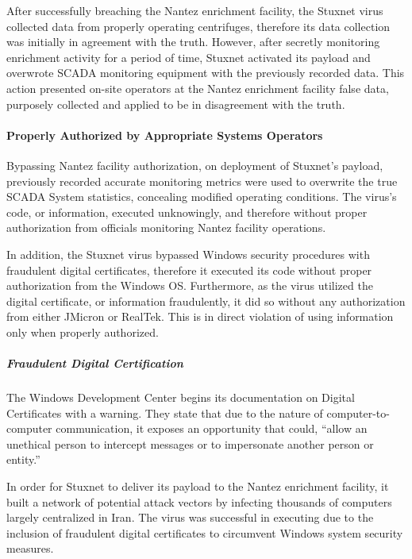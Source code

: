 \documentclass[12pt]{article}
\begin{document}
\begin{multicols}{2}
After successfully breaching the Nantez enrichment facility, the Stuxnet virus collected data from properly operating centrifuges, therefore its data collection was initially in agreement with the truth. However, after secretly monitoring enrichment activity for a period of time, Stuxnet activated its payload and overwrote SCADA monitoring equipment with the previously recorded data.\cite{toKillACentrifuge} This action presented on-site operators at the Nantez enrichment facility false data, purposely collected and applied to be in disagreement with the truth.

\paragraph{Properly Authorized by Appropriate Systems Operators}

Bypassing Nantez facility authorization, on deployment of Stuxnet's payload, previously recorded accurate monitoring metrics were used to overwrite the true SCADA System statistics, concealing modified operating conditions.\cite{theRealStoryOfStuxnet} The virus's code, or information, executed unknowingly, and therefore without proper authorization from officials monitoring Nantez facility operations.

In addition, the Stuxnet virus bypassed Windows security procedures with fraudulent digital certificates, therefore it executed its code without proper authorization from the Windows OS. Furthermore, as the virus utilized the digital certificate, or information fraudulently, it did so without any authorization from either JMicron or RealTek.\cite{signedUsingCertificates} This is in direct violation of using information only when properly authorized.

\subparagraph{Fraudulent Digital Certification}

The Windows Development Center begins its documentation on Digital Certificates with a warning. They state that due to the nature of computer-to-computer communication, it exposes an opportunity that could, ``allow an unethical person to intercept messages or to impersonate another person or entity.''\cite{moreOnDigitalCertificates}

In order for Stuxnet to deliver its payload to the Nantez enrichment facility, it built a network of potential attack vectors by infecting thousands of computers largely centralized in Iran.\cite{lessonsFromStuxnet} The virus was successful in executing due to the inclusion of fraudulent digital certificates to circumvent Windows system security measures.


\end{multicols}
\end{document}
